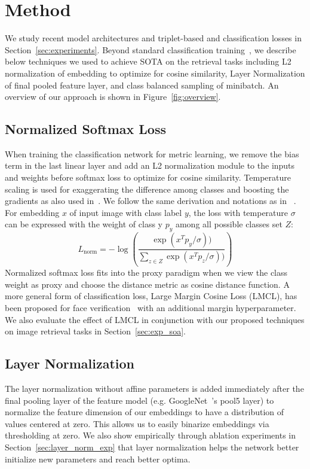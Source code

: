 \documentclass{bmvc2k}
\begin{document}
 
\section{Method} \label{sec:model}
We study recent model architectures and triplet-based and classification losses in Section~\ref{sec:experiments}. Beyond standard classification training~\cite{kaiming16}, we describe  below techniques we used to achieve SOTA on the retrieval tasks including L2 normalization of embedding to optimize for cosine similarity, Layer Normalization of final pooled feature layer, and class balanced sampling of minibatch. An overview of our approach is shown in Figure~\ref{fig:overview}.

\subsection{Normalized Softmax Loss}
When training the classification network for metric learning, we remove the bias term in the last linear layer and add an L2 normalization module to the inputs and weights before softmax loss to optimize for cosine similarity. Temperature scaling is used for exaggerating the difference among classes and boosting the gradients as also used in~\cite{scalablenca, Wang2018CosFaceLM,Liu2017SphereFaceDH}. We follow the same derivation and notations as in ~\cite{nofusslearning}. For embedding $x$ of input image with class label $y$, the loss with temperature $\sigma$ can be expressed with the weight of class y $p_y$ among all possible classes set $Z$:
\begin{equation}
\label{eq:proxy_cls_loss}
    L_{\text{norm}}
    = -\log\left(\frac{\exp(x^Tp_y / \sigma))}{\sum_{z \in Z} \exp(x^Tp_z/ \sigma))}\right)
\end{equation}
Normalized softmax loss fits into the proxy paradigm when we view the class weight as proxy and choose the distance metric as cosine distance function. A more general form of classification loss, Large Margin Cosine Loss (LMCL), has been proposed for face verification~\cite{Wang2018CosFaceLM} with an additional margin hyperparameter. We also evaluate the effect of LMCL in conjunction with our proposed techniques on image retrieval tasks in Section~\ref{sec:exp_soa}.
 
\subsection{Layer Normalization}
The layer normalization without affine parameters\cite{layernorm} is added immediately after the final pooling layer of the feature model (e.g. GoogleNet~\cite{googlenet2014}'s pool5 layer) to normalize the feature dimension of our embeddings to have a distribution of values centered at zero. This allows us to easily binarize embeddings via thresholding at zero. We also show empirically through ablation experiments in Section~\ref{sec:layer_norm_exp} that layer normalization helps the network better initialize new parameters and reach better optima.
 
\end{document}
